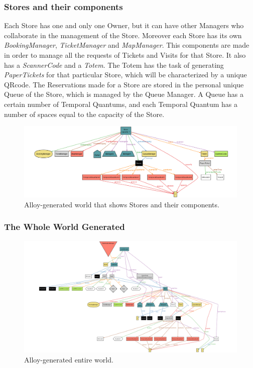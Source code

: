 \documentclass[a4paper, 12pt, oneside]{article}
\begin{document}
\subsubsection{Stores and their components}
Each Store has one and only one Owner, but it can have other Managers who collaborate in the management of the Store. Moreover each Store has its own \textit{BookingManager}, \textit{TicketManager} and \textit{MapManager}. This components are made in order to manage all the requests of Tickets and Visits for that Store. It also has a \textit{ScannerCode} and a \textit{Totem}. The Totem has the task of generating \textit{PaperTickets} for that particular Store, which will be characterized by a unique QRcode. The Reservations made for a Store are stored in the personal unique Queue of the Store, which is managed by the Queue Manager. A Queue has a certain number of Temporal Quantums, and each Temporal Quantum has a number of spaces equal to the capacity of the Store.
\begin{figure}[h!]
\centering
    \centering
    \includegraphics[height=0.23\textheight, scale=0.3, keepaspectratio]{img/alloy/alloy_store.png}
    \caption{Alloy-generated world that shows Stores and their components.}
    \label{alloy_stores}
\end{figure}

\subsubsection{The Whole World Generated}
\begin{figure}[h!]
\centering
    \centering
    \includegraphics[height=0.35\textheight, scale=0.3, keepaspectratio]{img/alloy/alloy_entire_world.png}
    \caption{Alloy-generated entire world.}
    \label{alloy_entire_world}
\end{figure}
\end{document}
